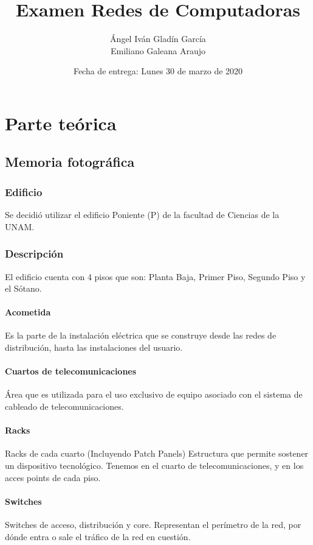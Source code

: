 \documentclass[spanish,12pt,letterpaper]{article}
\title{Examen Redes de Computadoras}
\author{Ángel Iván Gladín García\\
  Emiliano Galeana Araujo}
\affil{Facultad de ciencias, UNAM}
\date{Fecha de entrega: Lunes 30 de marzo de 2020}
\begin{document}
\maketitle

\section{Parte teórica}

\subsection{Memoria fotográfica}
\subsubsection{Edificio}
Se decidió utilizar el edificio Poniente (P) de la facultad de Ciencias de la
UNAM.

\subsubsection{Descripción}
El edificio cuenta con 4 pisos que son: Planta Baja, Primer Piso, Segundo Piso y
el Sótano.

\paragraph{Acometida} Es la parte de la instalación eléctrica que se construye
desde las redes de distribución, hasta las instalaciones del usuario.

\paragraph{Cuartos de telecomunicaciones} Área que es utilizada para el uso
exclusivo de equipo asociado  con el sistema de cableado de telecomunicaciones.

\paragraph{Racks} Racks de cada cuarto (Incluyendo Patch Panels) Estructura que
permite sostener un dispositivo tecnológico. Tenemos en el cuarto de
telecomunicaciones, y en los acces points de cada piso.

\paragraph{Switches} Switches de acceso, distribución y core. Representan el
perímetro de la red, por dónde entra o sale el tráfico de la red en cuestión.
\end{document}
